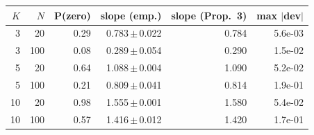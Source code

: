 \begin{tabular}{rrrrrr}
\toprule
$K$ & $N$ & P(zero) & slope (emp.) & slope (Prop.~3) & max $|$dev$|$ \\
\midrule
3 & 20 & 0.29 & 0.783\,$\pm$\,0.022 & 0.784 & 5.6e-03 \\
3 & 100 & 0.08 & 0.289\,$\pm$\,0.054 & 0.290 & 1.5e-02 \\
5 & 20 & 0.64 & 1.088\,$\pm$\,0.004 & 1.090 & 5.2e-02 \\
5 & 100 & 0.21 & 0.809\,$\pm$\,0.041 & 0.814 & 1.9e-01 \\
10 & 20 & 0.98 & 1.555\,$\pm$\,0.001 & 1.580 & 5.4e-02 \\
10 & 100 & 0.57 & 1.416\,$\pm$\,0.012 & 1.420 & 1.7e-01 \\
\bottomrule
\end{tabular}